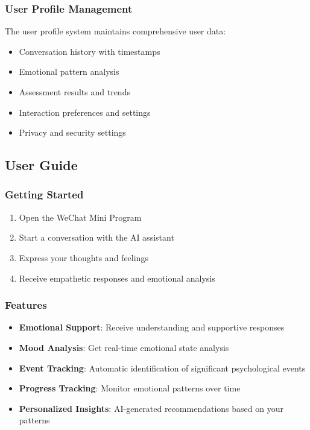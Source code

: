 \subsubsection{User Profile Management}

The user profile system maintains comprehensive user data:

\begin{itemize}
    \item Conversation history with timestamps
    \item Emotional pattern analysis
    \item Assessment results and trends
    \item Interaction preferences and settings
    \item Privacy and security settings
\end{itemize}

\subsection{User Guide}

\subsubsection{Getting Started}

\begin{enumerate}
    \item Open the WeChat Mini Program
    \item Start a conversation with the AI assistant
    \item Express your thoughts and feelings
    \item Receive empathetic responses and emotional analysis
\end{enumerate}

\subsubsection{Features}

\begin{itemize}
    \item \textbf{Emotional Support}: Receive understanding and supportive responses
    \item \textbf{Mood Analysis}: Get real-time emotional state analysis
    \item \textbf{Event Tracking}: Automatic identification of significant psychological events
    \item \textbf{Progress Tracking}: Monitor emotional patterns over time
    \item \textbf{Personalized Insights}: AI-generated recommendations based on your patterns
\end{itemize}

